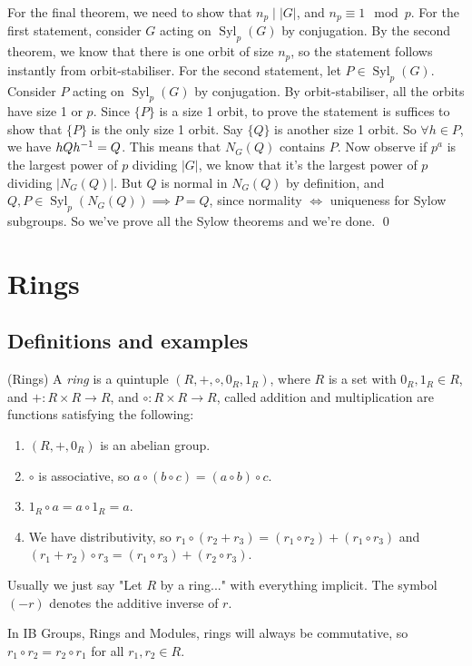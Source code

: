 \documentclass{article}
\DeclareMathOperator{\syl}{Syl}
\begin{document}
\par
For the final theorem, we need to show that $ n_p\mid |G| $, and $ n_p\equiv 1\mod p $. For the first statement, consider $ G $ acting on $ \syl_p(G) $ by conjugation. By the second theorem, we know that there is one orbit of size $ n_p $, so the statement follows instantly from orbit-stabiliser. For the second statement, let $ P\in \syl_p(G) $. Consider $ P $ acting on $ \syl_p(G) $ by conjugation. By orbit-stabiliser, all the orbits have size 1 or $ p $. Since $ \{P\} $ is a size 1 orbit, to prove the statement is suffices to show that $ \{P\} $ is the only size 1 orbit. Say $ \{Q\} $ is another size 1 orbit. So $ \forall h\in P $, we have $ hQ{h}^{-1}=Q $. This means that $ N_G(Q) $ contains $ P $. Now observe if $ p^a $ is the largest power of $ p $ dividing $ |G| $, we know that it's the largest power of $ p $ dividing $ |N_G(Q)| $. But $ Q $ is normal in $ N_G(Q) $ by definition, and $ Q,P\in \syl_p(N_G(Q))\implies P=Q $, since normality $ \iff $ uniqueness for Sylow subgroups. So we've prove all the Sylow theorems and we're done. \qed
\newpage
\section{Rings}
\subsection{Definitions and examples}
\begin{definition}
	(Rings) A \textit{ring} is a quintuple $ (R,+,\circ,0_R,1_R) $, where $ R $ is a set with $ 0_R,1_R\in R $, and $ +:R\times R\to R $, and $ \circ:R\times R\to R $, called addition and multiplication are functions satisfying the following:
	\begin{enumerate}
		\item $ (R,+,0_R) $ is an abelian group.
		\item $ \circ $ is associative, so $ a\circ(b\circ c)=(a\circ b)\circ c $.
		\item $ 1_R\circ a = a\circ 1_R=a $.
		\item We have distributivity, so $ r_1\circ (r_2+r_3)=(r_1\circ r_2)+(r_1\circ r_3) $ and $ (r_1+r_2)\circ r_3=(r_1\circ r_3)+(r_2\circ r_3) $.
	\end{enumerate}
\end{definition}

Usually we just say "Let $ R $ by a ring..." with everything implicit. The symbol $ (-r) $ denotes the additive inverse of $ r $.\par
In IB Groups, Rings and Modules, rings will always be commutative, so $ r_1\circ r_2=r_2\circ r_1 $ for all $ r_1,r_2\in R $.
\end{document}
